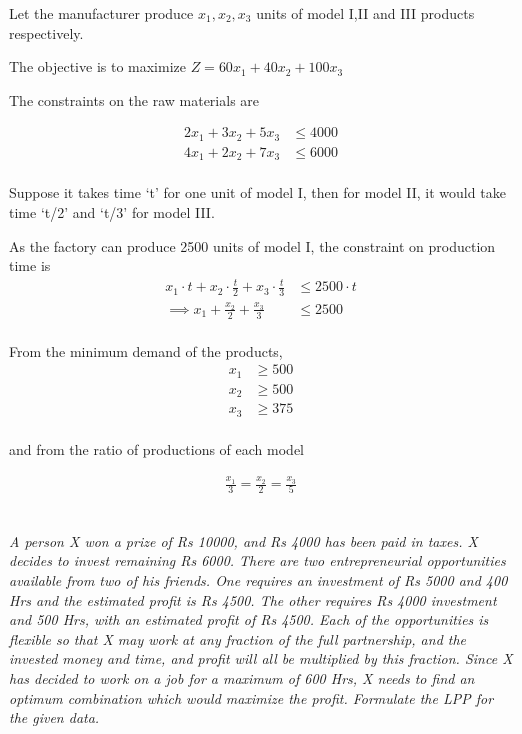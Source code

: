 \documentclass[12pt]{article}
\begin{document}
Let the manufacturer produce $x_1,x_2,x_3$ units of model I,II and III products respectively.

The objective is to maximize $Z=60x_1+40x_2+100x_3$

The constraints on the raw materials are 

\begin{align*}
2x_1+3x_2+5x_3 & \le 4000 \tag{raw material A} \\
4x_1+2x_2+7x_3 & \le 6000 \tag{raw material B} \\
\end{align*}

Suppose it takes time `t' for one unit of model I, then for model II, it would take time `t/2' and `t/3' for model III.

As the factory can produce 2500 units of model I, the constraint on production time is 
\begin{align*}
x_1\cdot t+x_2\cdot \frac{t}{2}+x_3\cdot \frac{t}{3}&\le 2500 \cdot t  \\
\implies x_1+\frac{x_2}{2}+\frac{x_3}{3}&\le 2500  \\
\end{align*}

From the minimum demand of the products,
\begin{align*}
x_1 & \ge 500 \\
x_2 & \ge 500 \\
x_3 & \ge 375 \\
\end{align*}

and from the ratio of productions of each model

\begin{align*}
\frac{x_1}{3}=\frac{x_2}{2}=\frac{x_3}{5}  \\
\end{align*}
\subsection{}

\emph{A person X won a prize of Rs 10000, and Rs 4000 has been paid in taxes. X decides to invest remaining Rs 6000. There are two entrepreneurial opportunities available from two of his friends. One requires an investment of Rs 5000 and 400 Hrs and the estimated profit is Rs 4500. The other requires Rs 4000 investment and 500 Hrs, with an estimated profit of Rs 4500. Each of the opportunities is flexible so that X may work at any fraction of the full partnership, and the invested money and time, and profit will all be multiplied by this fraction. Since X has decided to work on a job for a maximum of 600 Hrs, X needs to find an optimum combination which would maximize the profit. Formulate the LPP for the given data.}
\end{document}
